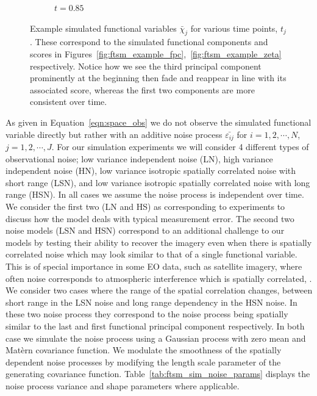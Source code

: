 \begin{figure}
\begin{subfigure}[b]{0.45\textwidth}
		\caption{$t=0.85$}
	\end{subfigure}
	\caption{Example simulated functional variables $\bar{\chi}_j$ for various time points, $t_j$. These correspond to the simulated functional components and scores in Figures~\ref{fig:ftsm_example_fpc},~\ref{fig:ftsm_example_zeta} respectively. Notice how we see the third principal component prominently at the beginning then fade and reappear in line with its associated score, whereas the first two components are more consistent over time.}
	\label{fig:ftsm_chi_example}
\end{figure}

As given in Equation~\eqref{eqn:space_obs} we do not observe the simulated functional variable directly but rather with an additive noise process $\bar{\varepsilon_{ij}}$ for $i=1,2,\cdots, N$, $j=1,2,\cdots, J$.
For our simulation experiments we will consider 4 different types of observational noise; low variance independent noise (LN), high variance independent noise (HN), low variance isotropic spatially correlated noise with short range (LSN), and low variance isotropic spatially correlated noise with long range (HSN).
In all cases we assume the noise process is independent over time. 
We consider the first two (LN and HS) as corresponding to experiments to discuss how the model deals with typical measurement error. 
The second two noise models (LSN and HSN) correspond to an additional challenge to our models by testing their ability to recover the imagery even when there is spatially correlated noise which may look similar to that of a single functional variable. 
This is of special importance in some EO data, such as satellite imagery, where often noise corresponds to atmospheric interference which is spatially correlated, \citep{oliver_understanding_2004}. 
We consider two cases where the range of the spatial correlation changes, between short range in the LSN noise and long range
 dependency in the HSN noise. 
In these two noise process they correspond to the noise process being spatially similar to the last and first functional principal component respectively.
 In both case we simulate the noise process using a Gaussian process with zero mean and  Mat\`{e}rn covariance function. 
 We modulate the smoothness of the spatially dependent noise processes by modifying  the length scale parameter of the generating covariance function.
 Table~\ref{tab:ftsm_sim_noise_params} displays the noise process variance and shape parameters where applicable. 
 
